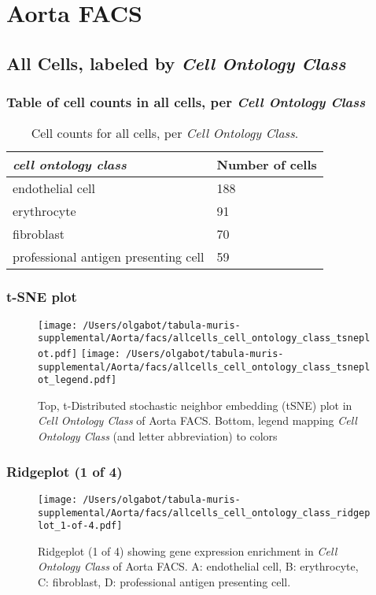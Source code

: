 \clearpage
\section{Aorta FACS}

\subsection{All Cells, labeled by \emph{Cell Ontology Class}}
\subsubsection{Table of cell counts in all cells, per \emph{Cell Ontology Class}}\begin{table}[h]
\centering
\label{my-label}
\begin{tabular}{@{}ll@{}}
\toprule

\emph{cell ontology class}& Number of cells \\ \midrule
endothelial cell & 188 \\

erythrocyte & 91 \\

fibroblast & 70 \\

professional antigen presenting cell & 59 \\
\bottomrule
\end{tabular}
\caption{Cell counts for all cells, per \emph{Cell Ontology Class}.}
\end{table}

\clearpage
\subsubsection{t-SNE plot}
\begin{figure}[h]
\centering
\texttt{[image: /Users/olgabot/tabula-muris-supplemental/Aorta/facs/allcells\_cell\_ontology\_class\_tsneplot.pdf]}
\texttt{[image: /Users/olgabot/tabula-muris-supplemental/Aorta/facs/allcells\_cell\_ontology\_class\_tsneplot\_legend.pdf]}
\caption{Top, t-Distributed stochastic neighbor embedding (tSNE) plot  in \emph{Cell Ontology Class} of Aorta FACS. Bottom, legend mapping \emph{Cell Ontology Class} (and letter abbreviation) to colors}
\end{figure}


\clearpage
\subsubsection{Ridgeplot (1 of 4)}
\begin{figure}[h]
\centering
\texttt{[image: /Users/olgabot/tabula-muris-supplemental/Aorta/facs/allcells\_cell\_ontology\_class\_ridgeplot\_1-of-4.pdf]}

\caption{ Ridgeplot (1 of 4)  showing gene expression enrichment in \emph{Cell Ontology Class} of Aorta FACS. A: endothelial cell, B: erythrocyte, C: fibroblast, D: professional antigen presenting cell.}
\end{figure}


